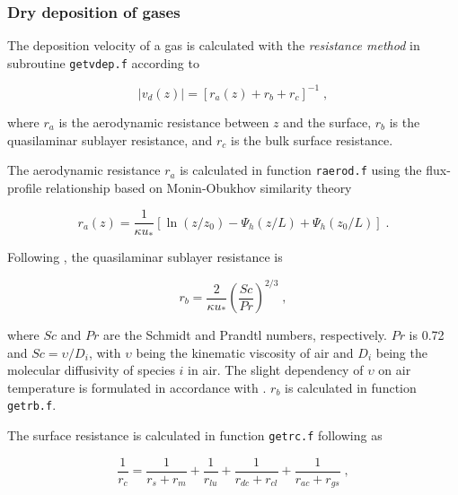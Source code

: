 \documentclass{egu}                  %
\begin{document}
\subsubsection{Dry deposition of gases}

The deposition velocity of a gas is calculated with the {\em resistance method}
\citep{wesely1977} in subroutine \verb|getvdep.f| according to

\begin{equation}
|v_d(z)|=\left[r_a(z)+r_b+r_c\right]^{-1} \;,
\end{equation}

where $r_a$ is the aerodynamic resistance between $z$ and the surface, $r_b$ is
the quasilaminar sublayer resistance, and $r_c$ is the bulk surface resistance.

The aerodynamic resistance $r_a$ is calculated in function \verb|raerod.f|
using the flux-profile relationship based on Monin-Obukhov similarity theory
\citep{stull1988}

\begin{equation}
r_a(z)=\frac{1}{\kappa u_*}[\ln(z/z_0)- \Psi _h(z/L)+ \Psi _h(z_0/L)] \;.
\label{ra}
\end{equation}

Following \citet{erisman1994}, the quasilaminar sublayer resistance is

\begin{equation}
r_b=\frac{2}{\kappa u_*} \left(\frac{Sc}{Pr}\right)^{2/3} \;,
\end{equation}

where $Sc$ and $Pr$ are the Schmidt and Prandtl numbers, respectively.  $Pr$ is
0.72 and $Sc=\upsilon/D_i$, with $\upsilon$ being the kinematic viscosity of
air and $D_i$ being the molecular diffusivity of species $i$ in air.  The
slight dependency of $\upsilon$ on air temperature is formulated in accordance
with \citet{pruppacher1978}.  $r_b$ is calculated in function
\verb|getrb.f|.\par

The surface resistance is calculated in function \verb|getrc.f| following
\citet{wesely1989} as

\begin{equation}
\frac{1}{r_c}=
\frac{1}{r_s+r_m}+\frac{1}{r_{lu}}+\frac{1}{r_{dc}+r_{cl}}+\frac{1}{r_{ac}+r_{gs}} \;,
\end{equation}
\end{document}

